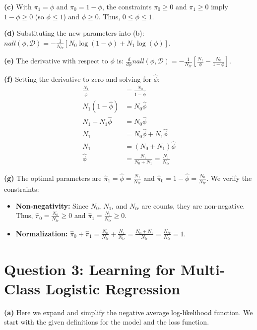 \documentclass[11pt]{article}
\begin{document}
\noindent\textbf{(c)} With $\pi_1 = \phi$ and $\pi_0 = 1 - \phi$, the constraints $\pi_0 \ge 0$ and $\pi_1 \ge 0$ imply $1 - \phi \ge 0$ (so $\phi \le 1$) and $\phi \ge 0$. Thus, $0 \le \phi \le 1$.

\noindent\textbf{(d)} Substituting the new parameters into (b):  
$ nall(\phi, \mathcal{D}) = -\frac{1}{N_{tr}} \left[ N_0 \log(1-\phi) + N_1 \log(\phi) \right] $.

\noindent\textbf{(e)} The derivative with respect to $\phi$ is:  
$ \frac{d}{d\phi}nall(\phi, \mathcal{D}) = -\frac{1}{N_{tr}} \left[ \frac{N_1}{\phi} - \frac{N_0}{1-\phi} \right] $.

\noindent\textbf{(f)} Setting the derivative to zero and solving for $\hat{\phi}$:
\begin{align*}
    \frac{N_1}{\hat{\phi}} &= \frac{N_0}{1-\hat{\phi}} \\
    N_1(1-\hat{\phi}) &= N_0\hat{\phi} \\
    N_1 - N_1\hat{\phi} &= N_0\hat{\phi} \\
    N_1 &= N_0\hat{\phi} + N_1\hat{\phi} \\
    N_1 &= (N_0 + N_1)\hat{\phi} \\
    \hat{\phi} &= \frac{N_1}{N_0 + N_1} = \frac{N_1}{N_{tr}}
\end{align*}

\noindent\textbf{(g)} The optimal parameters are $\hat{\pi}_1 = \hat{\phi} = \frac{N_1}{N_{tr}}$ and $\hat{\pi}_0 = 1 - \hat{\phi} = \frac{N_0}{N_{tr}}$. We verify the constraints:
\begin{itemize}
    \item \textbf{Non-negativity:} Since $N_0$, $N_1$, and $N_{tr}$ are counts, they are non-negative. Thus, $\hat{\pi}_0 = \frac{N_0}{N_{tr}} \ge 0$ and $\hat{\pi}_1 = \frac{N_1}{N_{tr}} \ge 0$.
    \item \textbf{Normalization:} $\hat{\pi}_0 + \hat{\pi}_1 = \frac{N_0}{N_{tr}} + \frac{N_1}{N_{tr}} = \frac{N_0 + N_1}{N_{tr}} = \frac{N_{tr}}{N_{tr}} = 1$.
\end{itemize}
\section*{Question 3: Learning for Multi-Class Logistic Regression}

\noindent\textbf{(a)} Here we expand and simplify the negative average log-likelihood function. We start with the given definitions for the model and the loss function.
\end{document}
